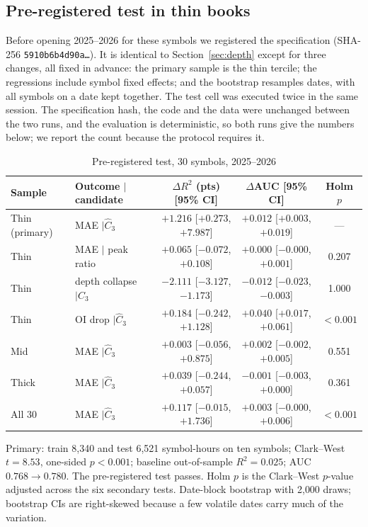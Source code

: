 \subsection{Pre-registered test in thin books}\label{sec:x6}
Before opening 2025--2026 for these symbols we registered the specification (SHA-256 \texttt{5910b6b4d90a\ldots}). It is identical to Section~\ref{sec:depth} except for three changes, all fixed in advance: the primary sample is the thin tercile; the regressions include symbol fixed effects; and the bootstrap resamples dates, with all symbols on a date kept together. The test cell was executed twice in the same session. The specification hash, the code and the data were unchanged between the two runs, and the evaluation is deterministic, so both runs give the numbers below; we report the count because the protocol requires it.

\begin{table}[t]\centering
\begin{threeparttable}
\caption{Pre-registered test, 30 symbols, 2025--2026}\label{tab:x6}
\small\setlength{\tabcolsep}{4pt}
\begin{tabular}{llccc}
\toprule
Sample & Outcome $\mid$ candidate & $\Delta R^2$ (pts) [95\% CI] & $\Delta$AUC [95\% CI] & Holm $p$\\
\midrule
Thin (primary) & MAE $\mid\hat C_3$ & $+1.216$ [$+0.273$, $+7.987$] & $+0.012$ [$+0.003$, $+0.019$] & ---\\
Thin & MAE $\mid$ peak ratio & $+0.065$ [$-0.072$, $+0.108$] & $+0.000$ [$-0.000$, $+0.001$] & 0.207\\
Thin & depth collapse $\mid\hat C_3$ & $-2.111$ [$-3.127$, $-1.173$] & $-0.012$ [$-0.023$, $-0.003$] & 1.000\\
Thin & OI drop $\mid\hat C_3$ & $+0.184$ [$-0.242$, $+1.128$] & $+0.040$ [$+0.017$, $+0.061$] & $<0.001$\\
Mid & MAE $\mid\hat C_3$ & $+0.003$ [$-0.056$, $+0.875$] & $+0.002$ [$-0.002$, $+0.005$] & 0.551\\
Thick & MAE $\mid\hat C_3$ & $+0.039$ [$-0.244$, $+0.057$] & $-0.001$ [$-0.003$, $+0.000$] & 0.361\\
All 30 & MAE $\mid\hat C_3$ & $+0.117$ [$-0.015$, $+1.736$] & $+0.003$ [$-0.000$, $+0.006$] & $<0.001$\\
\bottomrule
\end{tabular}
\begin{tablenotes}\footnotesize\item Primary: train 8{,}340 and test 6{,}521 symbol-hours on ten symbols; Clark--West $t=8.53$, one-sided $p<0.001$; baseline out-of-sample $R^2=0.025$; AUC $0.768\to0.780$. The pre-registered test passes. Holm $p$ is the Clark--West $p$-value adjusted across the six secondary tests. Date-block bootstrap with 2{,}000 draws; bootstrap CIs are right-skewed because a few volatile dates carry much of the variation. \end{tablenotes}
\end{threeparttable}
\end{table}

